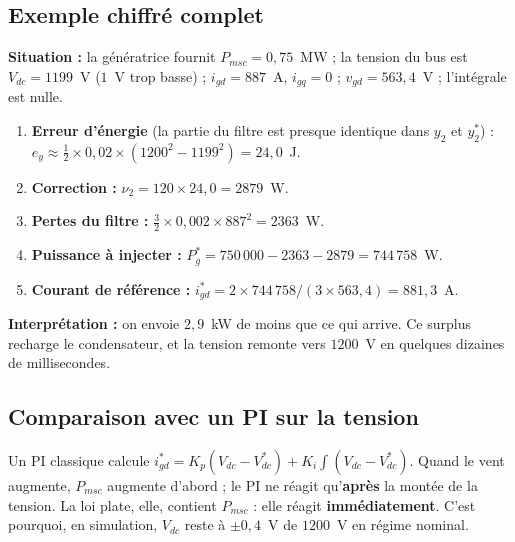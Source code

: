 \documentclass[11pt,a4paper]{article}
\begin{document}
\subsection{Exemple chiffré complet}
\begin{exemple}
\textbf{Situation :} la génératrice fournit $P_{msc} = 0{,}75$~MW ; la tension du bus est $V_{dc} = 1199$~V
($1$~V trop basse) ; $i_{gd} = 887$~A, $i_{gq} = 0$ ; $v_{gd} = 563{,}4$~V ; l'intégrale est nulle.
\begin{enumerate}
\item \textbf{Erreur d'énergie} (la partie du filtre est presque identique dans $y_2$ et $y_2^*$) :
      $e_y \approx \tfrac12\times0{,}02\times(1200^2 - 1199^2) = 24{,}0$~J.
\item \textbf{Correction :} $\nu_2 = 120\times24{,}0 = 2879$~W.
\item \textbf{Pertes du filtre :} $\tfrac32\times0{,}002\times887^2 = 2363$~W.
\item \textbf{Puissance à injecter :} $P_g^* = 750\,000 - 2363 - 2879 = 744\,758$~W.
\item \textbf{Courant de référence :} $i_{gd}^* = 2\times744\,758/(3\times563{,}4) = 881{,}3$~A.
\end{enumerate}
\textbf{Interprétation :} on envoie $2{,}9$~kW de moins que ce qui arrive. Ce surplus recharge le
condensateur, et la tension remonte vers $1200$~V en quelques dizaines de millisecondes.
\end{exemple}

\subsection{Comparaison avec un PI sur la tension}
Un PI classique calcule $i_{gd}^* = K_p(V_{dc}-V_{dc}^*) + K_i\int(V_{dc}-V_{dc}^*)$. Quand le vent augmente,
$P_{msc}$ augmente d'abord ; le PI ne réagit qu'\textbf{après} la montée de la tension. La loi plate, elle,
contient $P_{msc}$ : elle réagit \textbf{immédiatement}. C'est pourquoi, en simulation, $V_{dc}$ reste à
$\pm0{,}4$~V de $1200$~V en régime nominal.

\end{document}
